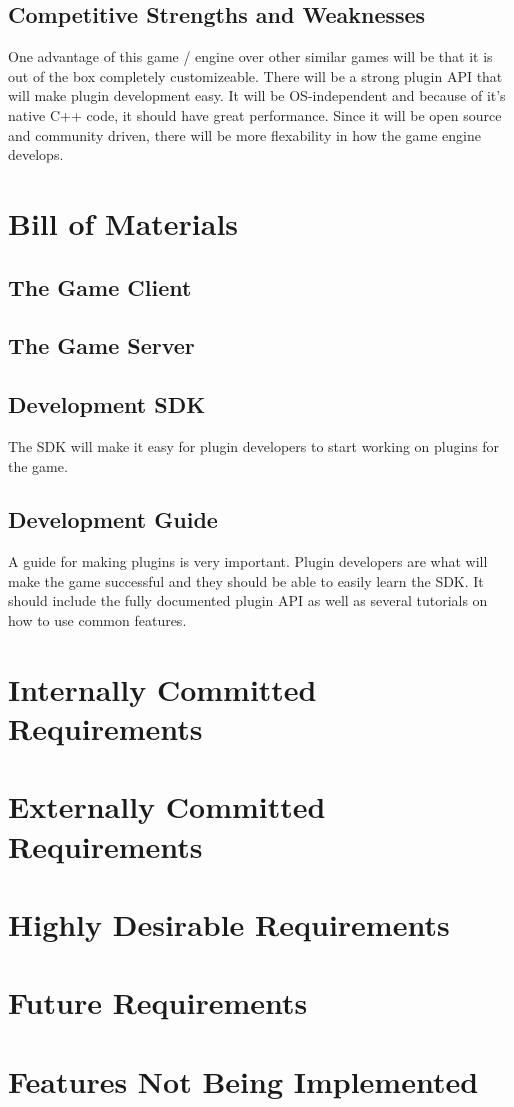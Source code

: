 \documentclass{article}
\begin{document}
\subsection{Competitive Strengths and Weaknesses}
One advantage of this game / engine over other similar games will be that it is 
out of the box completely customizeable.  There will be a strong plugin API that will
make plugin development easy.  It will be OS-independent and because of it's native
C++ code, it should have great performance.  Since it will be open source and community driven, there will be more flexability in how the game engine develops. 
\section{Bill of Materials}

\subsection{The Game Client}
\subsection{The Game Server}
\subsection{Development SDK}
The SDK will make it easy for plugin developers to start working on plugins for the game.
\subsection{Development Guide}
A guide for making plugins is very important.  Plugin developers are what will make the
game successful and they should be able to easily learn the SDK.  It should include the
fully documented plugin API as well as several tutorials on how to use common features.
\section{Internally Committed Requirements}

\section{Externally Committed Requirements}

\section{Highly Desirable Requirements}

\section{Future Requirements}

\section{Features Not Being Implemented}
\end{document}
